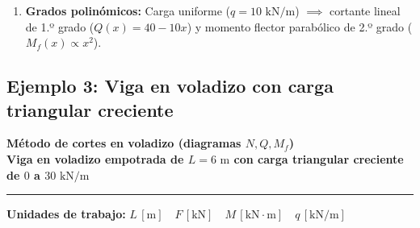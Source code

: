 {\begin{enumerate}
              \begin{itemize}

                  \item El cortante $Q(x)$ es continuo en $x = 2\text{ m}$ ($Q(2) = 20\text{ kN}$) ya que no actúa ninguna carga puntual transversal concentrada.

                  \item En $x = 2\text{ m}$ actúa un momento horario concentrado $M_0 = 30\text{ kN}\cdot\text{m}$, provocando un salto vertical ascendente en el momento flector:

                        \[

                            \Delta M_f = M_f(2^+) - M_f(2^-) = -20 - (-50) = +30\text{ kN}\cdot\text{m} = +M_0

                        \]

              \end{itemize}

        \item \textbf{Grados polinómicos:} Carga uniforme ($q = 10\text{ kN/m}$) $\implies$ cortante lineal de 1.º grado ($Q(x) = 40 - 10x$) y momento flector parabólico de 2.º grado ($M_f(x) \propto x^2$).

    \end{enumerate}

}





\subsection{Ejemplo 3: Viga en voladizo con carga triangular creciente}



\begin{tcolorbox}[colback=blue!3!white, colframe=blue!40!black, arc=3pt, boxrule=0.8pt, left=8pt, right=8pt, top=6pt, bottom=6pt]

    \centering

    {\Large\bfseries\color{blue!60!black} Método de cortes en voladizo (diagramas $N, Q, M_f$)}\\[2pt]

    {\normalsize\bfseries Viga en voladizo empotrada de $L = 6\text{ m}$ con carga triangular creciente de $0$ a $30\text{ kN/m}$}



    \vspace{4pt}\hrule\vspace{4pt}

    {\small\textbf{Unidades de trabajo:} $L\,[\text{m}] \quad F\,[\text{kN}] \quad M\,[\text{kN}\cdot\text{m}] \quad q\,[\text{kN/m}]$}

\end{tcolorbox}



